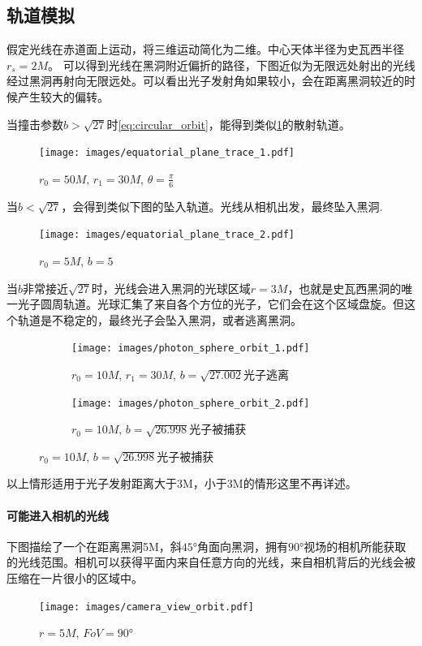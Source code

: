 \subsection{轨道模拟}
假定光线在赤道面上运动，将三维运动简化为二维。中心天体半径为史瓦西半径$r_s=2M$。
可以得到光线在黑洞附近偏折的路径，下图近似为无限远处射出的光线经过黑洞再射向无限远处。可以看出光子发射角如果较小，会在距离黑洞较近的时候产生较大的偏转。

当撞击参数$b>\sqrt{27}$时\eqref{eq:circular_orbit}，能得到类似\ref{fig:equatorial_plane_trace_1}的散射轨道。
\begin{figure}[htbp]
    \centering
    \texttt{[image: images/equatorial\_plane\_trace\_1.pdf]}
    \caption{$r_0=50M$, $r_1=30M$, $\theta=\frac{\pi}{6}$}\label{fig:equatorial_plane_trace_1} %
\end{figure}


当$b<\sqrt{27}$，会得到类似下图的坠入轨道。光线从相机出发，最终坠入黑洞.\begin{figure}[H]
    \centering
    \texttt{[image: images/equatorial\_plane\_trace\_2.pdf]}
    \caption{$r_0=5M$, $b=5$}\label{fig:equatorial_plane_trace_2} %
\end{figure}

当$b$非常接近$\sqrt{27}$时，光线会进入黑洞的光球区域$r=3M$，也就是史瓦西黑洞的唯一光子圆周轨道。光球汇集了来自各个方位的光子，它们会在这个区域盘旋。但这个轨道是不稳定的，最终光子会坠入黑洞，或者逃离黑洞。
\begin{figure}[htbp]
    \centering
    \begin{subfigure}{.5\textwidth}
        \centering
        \texttt{[image: images/photon\_sphere\_orbit\_1.pdf]}
        \caption{$r_0=10M$, $r_1=30M$, $b=\sqrt{27.002}$光子逃离}\label{dphi_1} %
    \end{subfigure}%
    \begin{subfigure}{.5\textwidth}
        \centering
        \texttt{[image: images/photon\_sphere\_orbit\_2.pdf]}
        \caption{$r_0=10M$, $b=\sqrt{26.998}$光子被捕获}\label{dphi_2} %
    \end{subfigure}
\end{figure}

以上情形适用于光子发射距离大于3M，小于3M的情形这里不再详述。

\paragraph{可能进入相机的光线}
下图描绘了一个在距离黑洞5M，斜$\ang{45}$角面向黑洞，拥有$\ang{90}$视场的相机所能获取的光线范围。相机可以获得平面内来自任意方向的光线，来自相机背后的光线会被压缩在一片很小的区域中。
\begin{figure}[H]
    \centering
    \texttt{[image: images/camera\_view\_orbit.pdf]}
    \caption{$r=5M$, $FoV=\ang{90}$}\label{fig:camera_view_orbit} %
\end{figure}